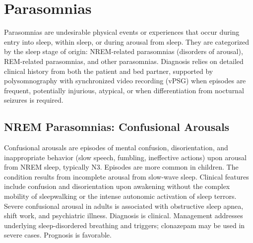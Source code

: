 \section{Parasomnias}








\label{sec:Parasomnias}

Parasomnias are undesirable physical events or experiences that occur during entry into sleep, within sleep, or during arousal from sleep. They are categorized by the sleep stage of origin: NREM-related parasomnias (disorders of arousal), REM-related parasomnias, and other parasomnias. Diagnosis relies on detailed clinical history from both the patient and bed partner, supported by polysomnography with synchronized video recording (vPSG) when episodes are frequent, potentially injurious, atypical, or when differentiation from nocturnal seizures is required.

\subsection{NREM Parasomnias: Confusional Arousals}
\label{sec:Confusional Arousals}
Confusional arousals are episodes of mental confusion, disorientation, and inappropriate behavior (slow speech, fumbling, ineffective actions) upon arousal from NREM sleep, typically N3. Episodes are more common in children. The condition results from incomplete arousal from slow-wave sleep. Clinical features include confusion and disorientation upon awakening without the complex mobility of sleepwalking or the intense autonomic activation of sleep terrors. Severe confusional arousal in adults is associated with obstructive sleep apnea, shift work, and psychiatric illness. Diagnosis is clinical. Management addresses underlying sleep-disordered breathing and triggers; clonazepam may be used in severe cases. Prognosis is favorable.

